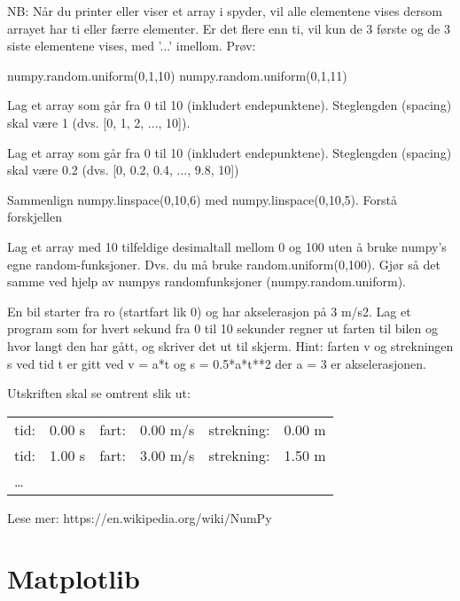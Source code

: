 NB: Når du printer eller viser et array i spyder, vil alle elementene vises dersom arrayet har ti eller færre elementer. Er det flere enn ti, vil kun de 3 første og de 3 siste elementene vises, med '...' imellom. Prøv:
\begin{usncodebox}
numpy.random.uniform(0,1,10)
numpy.random.uniform(0,1,11)
\end{usncodebox}

\begin{exercise}
Lag et array som går fra 0 til 10 (inkludert endepunktene). Steglengden (spacing) skal være 1  (dvs. [0, 1, 2, ..., 10]). 
\end{exercise}

\begin{exercise}
Lag et array som går fra 0 til 10 (inkludert endepunktene). Steglengden (spacing) skal være 0.2  (dvs. [0, 0.2, 0.4, ..., 9.8, 10])
\end{exercise}

\begin{exercise}
Sammenlign numpy.linspace(0,10,6) med numpy.linspace(0,10,5). Forstå forskjellen
\end{exercise}

\begin{exercise}
Lag et array med 10 tilfeldige desimaltall mellom 0 og 100 
uten å bruke numpy's egne random-funksjoner. 
Dvs. du må bruke random.uniform(0,100).
Gjør så det samme ved hjelp av numpys randomfunksjoner (numpy.random.uniform).
\end{exercise}

\begin{exercise}
En bil starter fra ro (startfart lik 0) og har akselerasjon på 3 m/s2. Lag et program som for hvert sekund fra 0 til 10 sekunder regner ut farten til bilen  og hvor langt den har gått, og skriver det ut til skjerm. Hint: farten v og strekningen s ved tid t er gitt ved v = a*t og s = 0.5*a*t**2 der a = 3 er akselerasjonen.

Utskriften skal se omtrent slik ut:
\begin{tabular}{l|r|l|r|l|r}
tid: & 0.00 s  &  fart: & 0.00 m/s &   strekning: &  0.00 m\\
tid: & 1.00 s  &  fart: & 3.00 m/s &   strekning: &  1.50 m\\
\ldots & & & & & 
\end{tabular}
\end{exercise}

Lese mer: https://en.wikipedia.org/wiki/NumPy

\section{Matplotlib}
\label{section:matplotlib}

